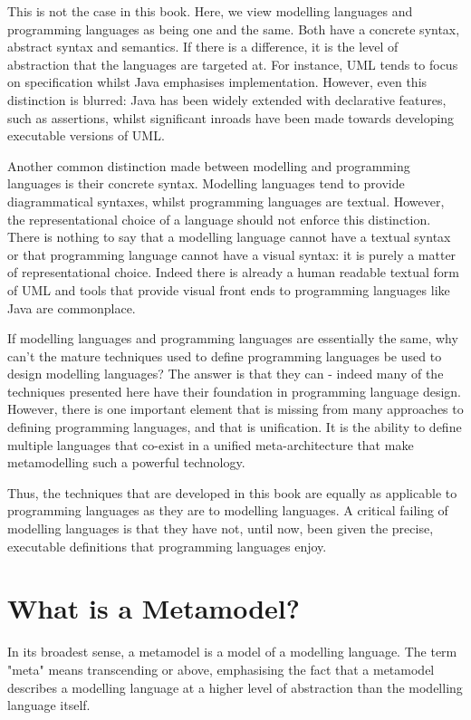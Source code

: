 This is not the case in this book. Here, we view modelling
languages and programming languages as being one and the same.
Both have a concrete syntax, abstract syntax and semantics. If
there is a difference, it is the level of abstraction that the
languages are targeted at. For instance, UML tends to focus on
specification whilst Java emphasises implementation. However, even
this distinction is blurred: Java has been widely extended with
declarative features, such as assertions, whilst significant
inroads have been made towards developing executable versions of
UML.

Another common distinction made between modelling and programming
languages is their concrete syntax. Modelling languages tend to
provide diagrammatical syntaxes, whilst programming languages are
textual. However, the representational choice of a language should
not enforce this distinction. There is nothing to say that a
modelling language cannot have a textual syntax or that
programming language cannot have a visual syntax: it is purely a
matter of representational choice. Indeed there is already a human
readable textual form of UML and tools that provide visual front
ends to programming languages like Java are commonplace.

If modelling languages and programming languages are essentially
the same, why can't the mature techniques used to define
programming languages be used to design modelling languages? The
answer is that they can - indeed many of the techniques presented
here have their foundation in programming language design.
However, there is one important element that is missing from many
approaches to defining programming languages, and that is
unification. It is the ability to define multiple languages that
co-exist in a unified meta-architecture that make metamodelling
such a powerful technology.

Thus, the techniques that are developed in this book are equally
as applicable to programming languages as they are to modelling
languages. A critical failing of modelling languages is that they
have not, until now, been given the precise, executable
definitions that programming languages enjoy.

\section{What is a Metamodel?}

In its broadest sense, a metamodel is a model of a modelling
language. The term "meta" means transcending or above, emphasising
the fact that a metamodel describes a modelling language at a
higher level of abstraction than the modelling language itself.


